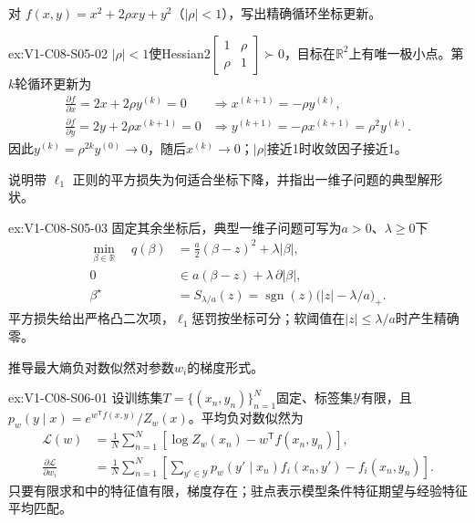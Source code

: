 \begin{SLChapterExercisePairSection}
\begin{exercise}\label{ex:V1-C08-S05-02}
对 $f(x,y)=x^2+2\rho xy+y^2$（$|\rho|<1$），写出精确循环坐标更新。
\end{exercise}
\label{sol:V1-C08-S05-02}
\begin{chapterexercisesolution}{ex:V1-C08-S05-02}
$|\rho|<1$使Hessian$2\begin{bmatrix}1&\rho\\\rho&1\end{bmatrix}\succ0$，目标在$\mathbb R^2$上有唯一极小点。第$k$轮循环更新为
\[
\begin{aligned}
\frac{\partial f}{\partial x}=2x+2\rho y^{(k)}=0
&\Longrightarrow x^{(k+1)}=-\rho y^{(k)},\\
\frac{\partial f}{\partial y}=2y+2\rho x^{(k+1)}=0
&\Longrightarrow y^{(k+1)}=-\rho x^{(k+1)}
=\rho^2y^{(k)}.
\end{aligned}
\]
因此$y^{(k)}=\rho^{2k}y^{(0)}\to0$，随后$x^{(k)}\to0$；$|\rho|$接近1时收敛因子接近1。
\end{chapterexercisesolution}

\begin{exercise}\label{ex:V1-C08-S05-03}
说明带 $\ell_1$ 正则的平方损失为何适合坐标下降，并指出一维子问题的典型解形状。
\end{exercise}
\label{sol:V1-C08-S05-03}
\begin{chapterexercisesolution}{ex:V1-C08-S05-03}
固定其余坐标后，典型一维子问题可写为$a>0$、$\lambda\ge0$下
\[
\begin{aligned}
\min_{\beta\in\mathbb R}\quad
q(\beta)&=\frac a2(\beta-z)^2+\lambda|\beta|,\\
0&\in a(\beta-z)+\lambda\,\partial|\beta|,\\
\beta^\star&=S_{\lambda/a}(z)
=\operatorname{sgn}(z)\bigl(|z|-\lambda/a\bigr)_+.
\end{aligned}
\]
平方损失给出严格凸二次项，$\ell_1$惩罚按坐标可分；软阈值在$|z|\le\lambda/a$时产生精确零。
\end{chapterexercisesolution}

\begin{exercise}\label{ex:V1-C08-S06-01}
推导最大熵负对数似然对参数$w_i$的梯度形式。
\end{exercise}
\label{sol:V1-C08-S06-01}
\begin{chapterexercisesolution}{ex:V1-C08-S06-01}
设训练集$T=\{(x_n,y_n)\}_{n=1}^N$固定、标签集$\mathcal Y$有限，且
$p_w(y\mid x)=e^{w^{\mathsf T}f(x,y)}/Z_w(x)$。平均负对数似然为
\[
\begin{aligned}
\mathcal L(w)
&=\frac1N\sum_{n=1}^N
\left[\log Z_w(x_n)-w^{\mathsf T}f(x_n,y_n)\right],\\
\frac{\partial\mathcal L}{\partial w_i}
&=\frac1N\sum_{n=1}^N
\left[\sum_{y'\in\mathcal Y}p_w(y'\mid x_n)f_i(x_n,y')
-f_i(x_n,y_n)\right].
\end{aligned}
\]
只要有限求和中的特征值有限，梯度存在；驻点表示模型条件特征期望与经验特征平均匹配。
\end{chapterexercisesolution}


\end{SLChapterExercisePairSection}
